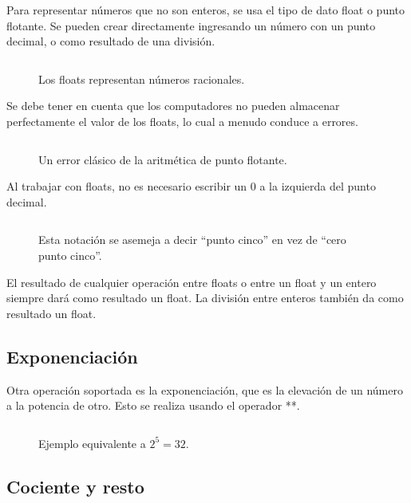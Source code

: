 \documentclass{article}
\newcommand{\doble}[1]{``#1''}
\begin{document}
Para representar números que no son enteros, se usa el tipo de dato float o punto flotante. Se pueden crear directamente ingresando un número con un punto decimal, o como resultado de una división.

\begin{figure}[ht!]
  \inputminted[frame=single, linenos]{python}{codigo/2-basico/float_1.py}
  \caption{Los floats representan números racionales.}
\end{figure}

Se debe tener en cuenta que los computadores no pueden almacenar perfectamente el valor de los floats, lo cual a menudo conduce a errores.

\begin{figure}[ht!]
  \inputminted[frame=single, linenos]{python}{codigo/2-basico/error_float.py}
  \caption{Un error clásico de la aritmética de punto flotante.}
\end{figure}

Al trabajar con floats, no es necesario escribir un 0 a la izquierda del punto decimal.

\begin{figure}[ht!]
  \inputminted[frame=single, linenos]{python}{codigo/2-basico/float_2.py}
  \caption{Esta notación se asemeja a decir \doble{punto cinco} en vez de \doble{cero punto cinco}.}
\end{figure}

El resultado de cualquier operación entre floats o entre un float y un entero siempre dará como resultado un float. La división entre enteros también da como resultado un float.


\subsection{Exponenciación}

Otra operación soportada es la exponenciación, que es la elevación de un número a la potencia de otro. Esto se realiza usando el operador **.

\begin{figure}[ht!]
  \inputminted[frame=single, linenos]{python}{codigo/2-basico/potencia.py}
  \caption{Ejemplo equivalente a $2 ^ 5 = 32$.}
\end{figure}

\subsection{Cociente y resto}
\end{document}
